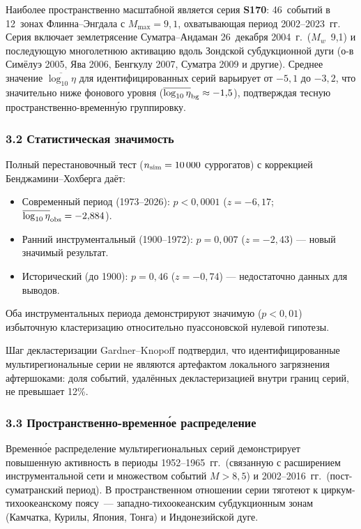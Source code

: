 \documentclass[12pt,a4paper]{article}
\begin{document}
Наиболее пространственно масштабной является серия \textbf{S170}: 46~событий
в 12~зонах Флинна--Энгдала с $M_{\max}=9{,}1$, охватывающая период 2002--2023~гг.
Серия включает землетрясение Суматра--Андаман 26~декабря 2004~г.\ ($M_w$~9,1)
и последующую многолетнюю активацию вдоль Зондской субдукционной дуги
(о-в Симёлуэ 2005, Ява 2006, Бенгкулу 2007, Суматра 2009 и другие).
Среднее значение $\overline{\log_{10}\eta}$ для идентифицированных серий
варьирует от $-5{,}1$ до $-3{,}2$, что значительно ниже фонового уровня
($\overline{\log_{10}\eta}_{\rm bg}\approx-1{,}5$), подтверждая тесную
пространственно-временн\'{у}ю группировку.

\subsubsection*{3.2 Статистическая значимость}

Полный перестановочный тест ($n_{\rm sim}=10\,000$ суррогатов) с коррекцией
Бенджамини--Хохберга даёт:
\begin{itemize}
\item Современный период (1973--2026): $p{<}0{,}0001$ ($z=-6{,}17$;
  $\overline{\log_{10}\eta}_{\rm obs}=-2{,}884$).
\item Ранний инструментальный (1900--1972): $p{=}0{,}007$ ($z=-2{,}43$)
  --- новый значимый результат.
\item Исторический (до 1900): $p{=}0{,}46$ ($z=-0{,}74$) --- недостаточно
  данных для выводов.
\end{itemize}
Оба инструментальных периода демонстрируют значимую ($p{<}0{,}01$)
избыточную кластеризацию относительно пуассоновской нулевой гипотезы.

Шаг декластеризации Gardner--Knopoff подтвердил, что идентифицированные
мультирегиональные серии не являются артефактом локального загрязнения
афтершоками: доля событий, удалённых декластеризацией внутри границ серий,
не превышает 12\%.

\subsubsection*{3.3 Пространственно-временн\'{о}е распределение}

Временн\'{о}е распределение мультирегиональных серий демонстрирует
повышенную активность в периоды 1952--1965~гг.\ (связанную с расширением
инструментальной сети и множеством событий $M>8{,}5$) и 2002--2016~гг.\
(пост-суматранский период). В пространственном отношении серии тяготеют
к циркум-тихоокеанскому поясу~--- западно-тихоокеанским субдукционным зонам
(Камчатка, Курилы, Япония, Тонга) и Индонезийской дуге.
\end{document}
